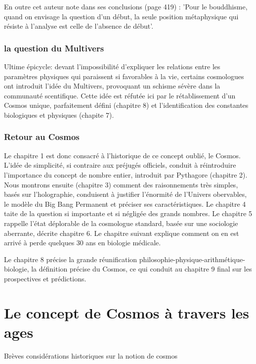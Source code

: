 \documentclass[a4paper,12pt]{article}
\begin{document}
    
    En outre cet auteur note dans ses conclusions (page 419) : 'Pour le bouddhisme, quand on envisage la question d'un début, la seule position métaphysique qui résiste à l'analyse est celle de l'absence de début'.


   
   
 \subsubsection{la question du Multivers} 
Ultime épicycle: devant l'impossibilité d'expliquer les relations entre les paramètres physiques qui paraissent si favorables à la vie, certains cosmologues ont introduit l'idée du Multivers, provoquant un schisme sévère dans la communauté scentifique. Cette idée est réfutée ici par le rétablissement d'un Cosmos unique, parfaitement défini (chapitre 8) et l'identification des constantes biologiques et physiques (chapite 7).
 
 
    
    

\subsubsection{Retour au Cosmos}
Le chapitre 1 est donc consacré à l'historique de ce concept oublié, le Cosmos. L'idée de simplicité, si contraire aux préjugés officiels, conduit à réintroduire l'importance du concept de nombre entier, introduit par Pythagore (chapitre 2). Nous montrons ensuite (chapitre 3) comment des raisonnements très simples, basés sur l'holographie, conduisent à justifier l'énormité de l'Univers obervables, le modèle du Big Bang Permanent et préciser ses caractéristiques. Le chapitre 4 taite de la question si importante et si négligée des grands nombres. Le chapitre 5 rappelle l'état déplorable de la cosmologue standard, basée sur une sociologie aberrante, décrite chapitre 6. Le chapitre suivant explique comment on en est arrivé à perde quelques 30 ans en biologie médicale.

Le chapitre 8 précise la grande réunification philosophie-physique-arithmétique-biologie, la définition précise du Cosmos, ce qui conduit au chapitre 9 final sur les prospectives et prédictions.


\section{Le concept de Cosmos à travers les ages}

Brèves considérations historiques sur la notion de cosmos
\end{document}
